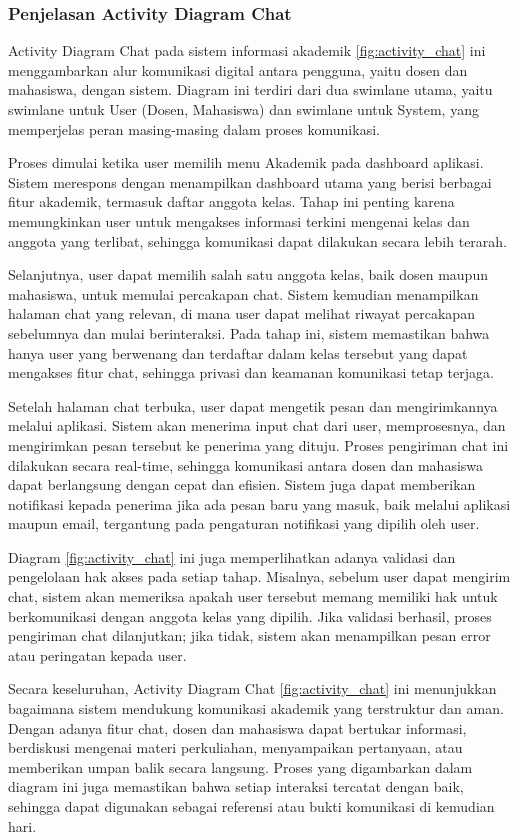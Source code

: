 \documentclass[a4paper,oneside,11pt]{book}
\begin{document}
\subsubsection{Penjelasan Activity Diagram Chat}
Activity Diagram Chat pada sistem informasi akademik \ref{fig:activity_chat} ini menggambarkan alur komunikasi digital antara pengguna, yaitu dosen dan mahasiswa, dengan sistem. Diagram ini terdiri dari dua swimlane utama, yaitu swimlane untuk User (Dosen, Mahasiswa) dan swimlane untuk System, yang memperjelas peran masing-masing dalam proses komunikasi.

Proses dimulai ketika user memilih menu Akademik pada dashboard aplikasi. Sistem merespons dengan menampilkan dashboard utama yang berisi berbagai fitur akademik, termasuk daftar anggota kelas. Tahap ini penting karena memungkinkan user untuk mengakses informasi terkini mengenai kelas dan anggota yang terlibat, sehingga komunikasi dapat dilakukan secara lebih terarah.

Selanjutnya, user dapat memilih salah satu anggota kelas, baik dosen maupun mahasiswa, untuk memulai percakapan chat. Sistem kemudian menampilkan halaman chat yang relevan, di mana user dapat melihat riwayat percakapan sebelumnya dan mulai berinteraksi. Pada tahap ini, sistem memastikan bahwa hanya user yang berwenang dan terdaftar dalam kelas tersebut yang dapat mengakses fitur chat, sehingga privasi dan keamanan komunikasi tetap terjaga.

Setelah halaman chat terbuka, user dapat mengetik pesan dan mengirimkannya melalui aplikasi. Sistem akan menerima input chat dari user, memprosesnya, dan mengirimkan pesan tersebut ke penerima yang dituju. Proses pengiriman chat ini dilakukan secara real-time, sehingga komunikasi antara dosen dan mahasiswa dapat berlangsung dengan cepat dan efisien. Sistem juga dapat memberikan notifikasi kepada penerima jika ada pesan baru yang masuk, baik melalui aplikasi maupun email, tergantung pada pengaturan notifikasi yang dipilih oleh user.

Diagram \ref{fig:activity_chat} ini juga memperlihatkan adanya validasi dan pengelolaan hak akses pada setiap tahap. Misalnya, sebelum user dapat mengirim chat, sistem akan memeriksa apakah user tersebut memang memiliki hak untuk berkomunikasi dengan anggota kelas yang dipilih. Jika validasi berhasil, proses pengiriman chat dilanjutkan; jika tidak, sistem akan menampilkan pesan error atau peringatan kepada user.

Secara keseluruhan, Activity Diagram Chat \ref{fig:activity_chat} ini menunjukkan bagaimana sistem mendukung komunikasi akademik yang terstruktur dan aman. Dengan adanya fitur chat, dosen dan mahasiswa dapat bertukar informasi, berdiskusi mengenai materi perkuliahan, menyampaikan pertanyaan, atau memberikan umpan balik secara langsung. Proses yang digambarkan dalam diagram ini juga memastikan bahwa setiap interaksi tercatat dengan baik, sehingga dapat digunakan sebagai referensi atau bukti komunikasi di kemudian hari.
\end{document}
